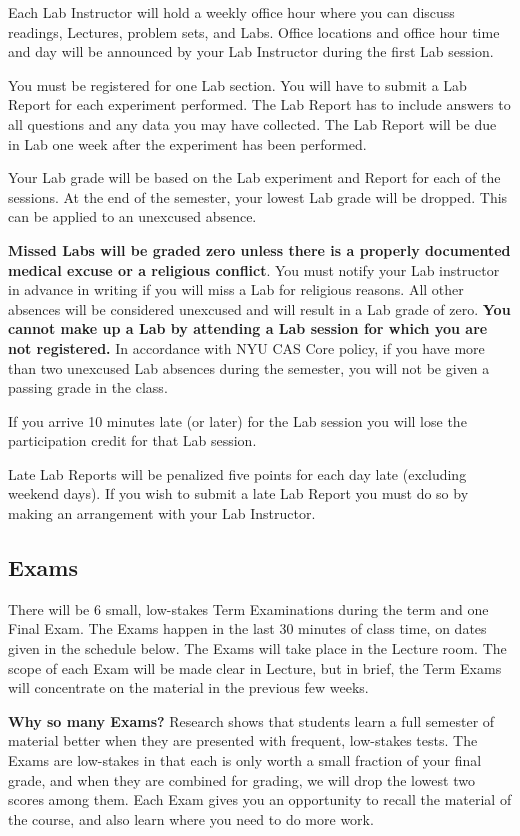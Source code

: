 \documentclass[12pt]{article}
\begin{document}
Each Lab Instructor will hold a weekly office hour where you can
discuss readings, Lectures, problem sets, and Labs.
Office locations and office hour time and day will be announced by
your Lab Instructor during the first Lab session.

You must be
registered for one Lab section. You will have to submit a Lab Report
for each experiment performed. The Lab Report has to include answers
to all questions and any data you may have collected. The Lab Report
will be due in Lab one week after the experiment has been performed.

Your Lab grade will be based on the Lab experiment and Report
for each of the sessions.  At the end of the semester, your lowest Lab
grade will be dropped. This can be applied to an unexcused absence.

\textbf{Missed Labs will be graded zero unless there is a properly
  documented medical excuse or a religious conflict}. You must notify
your Lab instructor in advance in writing if you will miss a Lab for
religious reasons. All other absences will be considered unexcused and
will result in a Lab grade of zero. \textbf{You cannot make up a Lab by
attending a Lab session for which you are not registered.}
In accordance with NYU CAS Core policy, if you have more than two
unexcused Lab absences during the semester, you will not be given a
passing grade in the class.

If you arrive 10 minutes late (or later) for the Lab session you will
lose the participation credit for that Lab session.

Late Lab Reports will be penalized five points for each day late
(excluding weekend days). If you wish to submit a late Lab Report you
must do so by making an arrangement with your Lab Instructor.

\subsection*{Exams}

There will be 6 small, low-stakes Term Examinations during the term
and one Final Exam. The Exams happen in the last 30 minutes of class
time, on dates given in the schedule below. The Exams will take place
in the Lecture room. The scope of each Exam will be made clear in
Lecture, but in brief, the Term Exams will concentrate on the material
in the previous few weeks.

\textbf{Why so many Exams?} Research shows that students learn a full
semester of material better when they are presented with frequent,
low-stakes tests. The Exams are low-stakes in that each is only worth
a small fraction of your final grade, and when they are combined for
grading, we will drop the lowest two scores among them. Each Exam
gives you an opportunity to recall the material of the course, and
also learn where you need to do more work.
\end{document}
